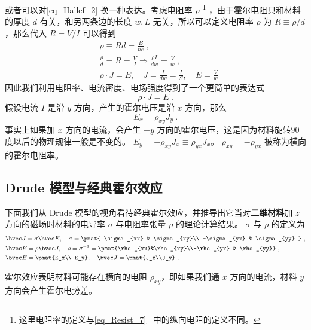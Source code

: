 或者可以对\autoref{eq_Hallef_2} 换一种表达。考虑电阻率 $\rho$
\footnote{这里电阻率的定义与\autoref{eq_Resist_7}~ 中的纵向电阻的定义不同。} ，由于霍尔电阻只和材料的厚度 $d$ 有关，和另两条边的长度 $w,L$ 无关，所以可以定义电阻率 $\rho$ 为 $R\equiv\rho /d$，那么代入 $R=V/I$ 可以得到
\begin{equation}
\begin{aligned}
&\rho\equiv Rd=\frac{B}{ne}~,\\
&\frac{\rho }{d} =R= \frac{V}{I}\Rightarrow \frac{\rho I}{dw}=\frac{V}{w}~,\\
&\rho \cdot J = E,\quad J= \frac{I}{dw}=\frac{I}{S},\quad E=\frac{V}{w}
\end{aligned}
\end{equation}
因此我们利用电阻率、电流密度、电场强度得到了一个更简单的表达式
\begin{equation}
\rho\cdot J=E~.
\end{equation}
假设电流 $I$ 是沿 $y$ 方向，产生的霍尔电压是沿 $x$ 方向，那么
\begin{equation}
E_x = \rho_{xy} J_y~.
\end{equation}
事实上如果加 $x$ 方向的电流，会产生 $-y$ 方向的霍尔电压，这是因为材料旋转90度以后的物理规律一般是不变的。 $E_y=-\rho_{xy} J_x\equiv \rho_{yx}J_x$。
$\rho_{xy}=-\rho_{yx}$ 被称为横向的霍尔电阻率。

\subsection{Drude 模型与经典霍尔效应}
下面我们从 Drude 模型的视角看待经典霍尔效应，并推导出它当对\textbf{二维材料}加 $z$ 方向的磁场时材料的电导率 $\sigma$ 与电阻率张量 $\rho$ 的理论计算结果。 $\sigma$ 与 $\rho$ 的定义为
\begin{equation}
\begin{aligned}
&\bvec J=\sigma \bvec E,\quad \sigma=\pmat{
    \sigma_{xx} & \sigma_{xy}\\
    -\sigma_{yx} & \sigma_{yy}
}
~,\\
&\bvec E=\rho \bvec J,\quad \rho = \sigma^{-1} =
\pmat{\rho_{xx}&\rho_{xy}\\-\rho_{yx} & \rho_{yy}}~,\\
&\bvec E=\pmat{E_x\\ E_y},\quad \bvec J = \pmat{J_x\\J_y}~.
\end{aligned}
\end{equation}

霍尔效应表明材料可能存在横向的电阻 $\rho_{xy}$，即如果我们通 $x$ 方向的电流，材料 $y$ 方向会产生霍尔电势差。

